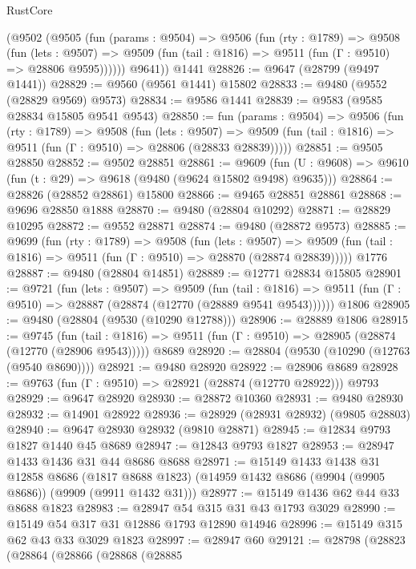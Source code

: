 \begin{lexlean}{RustCore}
\begin{coremodule}
      (@9502
        (@9505
          (fun (params : @9504) =>
          @9506
            (fun (rty : @1789) =>
            @9508
              (fun (lets : @9507) =>
              @9509 (fun (tail : @1816) => @9511 (fun (Γ : @9510) => @28806 @9595))))))
        @9641))
    @1441
@28826 := @9647 (@28799 (@9497 @1441))
@28829 := @9560 (@9561 @1441) @15802
@28833 := @9480 (@9552 (@28829 @9569) @9573)
@28834 := @9586 @1441
@28839 := @9583 (@9585 @28834 @15805 @9541 @9543)
@28850 := fun (params : @9504) =>
  @9506
    (fun (rty : @1789) =>
    @9508
      (fun (lets : @9507) =>
      @9509 (fun (tail : @1816) => @9511 (fun (Γ : @9510) => @28806 (@28833 @28839)))))
@28851 := @9505 @28850
@28852 := @9502 @28851
@28861 := @9609
    (fun (U : @9608) => @9610 (fun (t : @29) => @9618 (@9480 (@9624 @15802 @9498) @9635)))
@28864 := @28826 (@28852 @28861) @15800
@28866 := @9465 @28851 @28861
@28868 := @9696 @28850 @1888
@28870 := @9480 (@28804 @10292)
@28871 := @28829 @10295
@28872 := @9552 @28871
@28874 := @9480 (@28872 @9573)
@28885 := @9699
    (fun (rty : @1789) =>
    @9508
      (fun (lets : @9507) =>
      @9509 (fun (tail : @1816) => @9511 (fun (Γ : @9510) => @28870 (@28874 @28839)))))
    @1776
@28887 := @9480 (@28804 @14851)
@28889 := @12771 @28834 @15805
@28901 := @9721
    (fun (lets : @9507) =>
    @9509
      (fun (tail : @1816) =>
      @9511 (fun (Γ : @9510) => @28887 (@28874 (@12770 (@28889 @9541 @9543))))))
    @1806
@28905 := @9480 (@28804 (@9530 (@10290 @12788)))
@28906 := @28889 @1806
@28915 := @9745
    (fun (tail : @1816) => @9511 (fun (Γ : @9510) => @28905 (@28874 (@12770 (@28906 @9543)))))
    @8689
@28920 := @28804 (@9530 (@10290 (@12763 (@9540 @8690))))
@28921 := @9480 @28920
@28922 := @28906 @8689
@28928 := @9763 (fun (Γ : @9510) => @28921 (@28874 (@12770 @28922))) @9793
@28929 := @9647 @28920
@28930 := @28872 @10360
@28931 := @9480 @28930
@28932 := @14901 @28922
@28936 := @28929 (@28931 @28932) (@9805 @28803)
@28940 := @9647 @28930 @28932 (@9810 @28871)
@28945 := @12834 @9793 @1827 @1440 @45 @8689
@28947 := @12843 @9793 @1827
@28953 := @28947 @1433 @1436 @31 @44 @8686 @8688
@28971 := @15149
    @1433
    @1438
    @31
    @12858
    @8686
    (@1817 @8688 @1823)
    (@14959 @1432 @8686 (@9904 (@9905 @8686)) (@9909 (@9911 @1432 @31)))
@28977 := @15149 @1436 @62 @44 @33 @8688 @1823
@28983 := @28947 @54 @315 @31 @43 @1793 @3029
@28990 := @15149 @54 @317 @31 @12886 @1793 @12890 @14946
@28996 := @15149 @315 @62 @43 @33 @3029 @1823
@28997 := @28947 @60
@29121 := @28798
    (@28823
      (@28864
        (@28866
          (@28868
            (@28885

\end{coremodule}
\end{lexlean}
